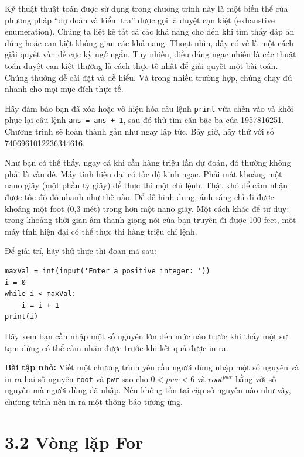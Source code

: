Kỹ thuật thuật toán được sử dụng trong chương trình này là một biến thể của phương pháp ``dự đoán và kiểm tra'' được gọi là duyệt cạn kiệt (exhaustive enumeration). Chúng ta liệt kê tất cả các khả năng cho đến khi tìm thấy đáp án đúng hoặc cạn kiệt không gian các khả năng. Thoạt nhìn, đây có vẻ là một cách giải quyết vấn đề cực kỳ ngớ ngẩn. Tuy nhiên, điều đáng ngạc nhiên là các thuật toán duyệt cạn kiệt thường là cách thực tế nhất để giải quyết một bài toán. Chúng thường dễ cài đặt và dễ hiểu. Và trong nhiều trường hợp, chúng chạy đủ nhanh cho mọi mục đích thực tế.

Hãy đảm bảo bạn đã xóa hoặc vô hiệu hóa câu lệnh \texttt{print} vừa chèn vào và khôi phục lại câu lệnh \texttt{ans = ans + 1}, sau đó thử tìm căn bậc ba của 1957816251. Chương trình sẽ hoàn thành gần như ngay lập tức. Bây giờ, hãy thử với số 7406961012236344616.

Như bạn có thể thấy, ngay cả khi cần hàng triệu lần dự đoán, đó thường không phải là vấn đề. Máy tính hiện đại có tốc độ kinh ngạc. Phải mất khoảng một nano giây (một phần tỷ giây) để thực thi một chỉ lệnh. Thật khó để cảm nhận được tốc độ đó nhanh như thế nào. Để dễ hình dung, ánh sáng chỉ đi được khoảng một foot (0,3 mét) trong hơn một nano giây. Một cách khác để tư duy: trong khoảng thời gian âm thanh giọng nói của bạn truyền đi được 100 feet, một máy tính hiện đại có thể thực thi hàng triệu chỉ lệnh.

Để giải trí, hãy thử thực thi đoạn mã sau:

\begin{verbatim}
maxVal = int(input('Enter a positive integer: '))
i = 0
while i < maxVal:
    i = i + 1
print(i)
\end{verbatim}

Hãy xem bạn cần nhập một số nguyên lớn đến mức nào trước khi thấy một sự tạm dừng có thể cảm nhận được trước khi kết quả được in ra.

\noindent \textbf{Bài tập nhỏ:} Viết một chương trình yêu cầu người dùng nhập một số nguyên và in ra hai số nguyên \texttt{root} và \texttt{pwr} sao cho $0 < pwr < 6$ và $root^{pwr}$ bằng với số nguyên mà người dùng đã nhập. Nếu không tồn tại cặp số nguyên nào như vậy, chương trình nên in ra một thông báo tương ứng.

\section*{3.2 Vòng lặp For}

